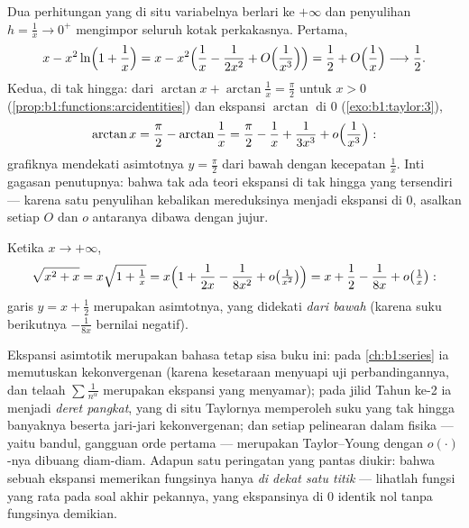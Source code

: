 \begin{example}\label{ex:b1:taylor:atinfinity}
Dua perhitungan yang di situ variabelnya berlari ke $+\infty$ dan
penyulihan $h = \frac1x \to 0^+$ mengimpor seluruh kotak perkakasnya.
Pertama,
\[
x - x^2\ln\Bigl(1 + \frac1x\Bigr)
= x - x^2\Bigl(\frac1x - \frac{1}{2x^2} +
O\Bigl(\frac{1}{x^3}\Bigr)\Bigr)
= \frac12 + O\Bigl(\frac1x\Bigr) \longrightarrow \frac12 .
\]
Kedua,  di tak hingga: dari $\arctan x +
\arctan\frac1x = \frac\pi2$ untuk $x > 0$
(\cref{prop:b1:functions:arcidentities}) dan ekspansi
$\arctan$ di $0$ (\cref{exo:b1:taylor:3}),
\[
\arctan x = \frac\pi2 - \arctan\frac1x
= \frac\pi2 - \frac1x + \frac{1}{3x^3} +
o\Bigl(\frac{1}{x^3}\Bigr) :
\]
grafiknya mendekati asimtotnya $y = \frac\pi2$ dari bawah dengan
kecepatan $\frac1x$. Inti gagasan penutupnya: bahwa tak ada teori
ekspansi di tak hingga yang tersendiri --- karena satu penyulihan kebalikan
mereduksinya menjadi ekspansi di $0$, asalkan setiap $O$ dan $o$
antaranya dibawa dengan jujur.
\end{example}

\begin{example}\label{ex:b1:taylor:asymptote}
Ketika $x \to +\infty$,
\[
\sqrt{x^2 + x} = x\sqrt{1 + \tfrac1x}
= x\Bigl(1 + \frac{1}{2x} - \frac{1}{8x^2} + o\bigl(\tfrac{1}{x^2}\bigr)\Bigr)
= x + \frac12 - \frac{1}{8x} + o\bigl(\tfrac 1x\bigr):
\]
garis $y = x + \frac12$ merupakan asimtotnya, yang didekati \emph{dari
bawah} (karena suku berikutnya $-\frac{1}{8x}$ bernilai negatif).
\end{example}

\begin{remark}
Ekspansi asimtotik merupakan bahasa tetap sisa
buku ini: pada \cref{ch:b1:series} ia memutuskan kekonvergenan
(karena kesetaraan menyuapi uji perbandingannya, dan telaah $\sum
\frac{1}{n^\alpha}$ merupakan ekspansi yang menyamar); pada jilid Tahun
ke-2 ia menjadi \emph{deret pangkat}, yang di situ 
Taylornya memperoleh suku yang tak hingga banyaknya beserta jari-jari
kekonvergenan; dan setiap pelinearan dalam fisika --- yaitu bandul,
gangguan orde pertama --- merupakan  Taylor--Young dengan
$o(\cdot)$-nya dibuang diam-diam. Adapun satu peringatan yang pantas diukir:
bahwa sebuah ekspansi memerikan fungsinya hanya \emph{di dekat satu titik} ---
lihatlah fungsi yang rata pada soal akhir pekannya, yang ekspansinya di
$0$ identik nol tanpa fungsinya demikian.
\end{remark}

